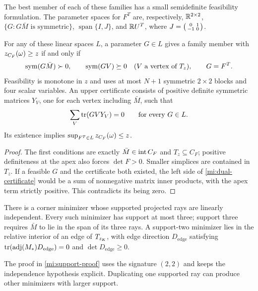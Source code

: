The best member of each of these families has a small semidefinite
feasibility formulation. The parameter spaces for $F^T$ are, respectively,
$\mathbb R^{2\times2}$, $\{G:G\bar M\text{ is symmetric}\}$,
$\operatorname{span}\{I,J\}$, and $\mathbb R U^T$, where
$J=\begin{psmallmatrix}0&1\\-1&0\end{psmallmatrix}$.

\begin{proposition}\label{mi:certificates}
For any of these linear spaces $L$, a parameter $G\in L$ gives a family
member with $z_{C_F}(\omega)\ge z$ if and only if
\[
 \operatorname{sym}(G\bar M)\succ0,\qquad \operatorname{sym}(GV)\succeq0\quad(V\text{ a vertex of }T_z),
 \qquad G=F^T.
\]
Feasibility is monotone in $z$ and uses at most $N+1$ symmetric
$2\times2$ blocks and four scalar variables.
An upper certificate consists of positive definite symmetric matrices
$Y_V$, one for each vertex including $\bar M$, such that
\begin{equation}\label{mi:dual-certificate}
 \sum_V\operatorname{tr}(GVY_V)=0\qquad\text{for every }G\in L.
\end{equation}
Its existence implies $\sup_{F^T\in L}z_{C_F}(\omega)\le z$.
\end{proposition}
\begin{proof}
The first conditions are exactly $\bar M\in\operatorname{int} C_F$ and $T_z\subseteq C_F$;
positive definiteness at the apex also forces $\det F>0$.
Smaller simplices are contained in $T_z$. If a feasible $G$ and the
certificate both existed, the left side of \cref{mi:dual-certificate}
would be a sum of nonnegative matrix inner products, with the apex term
strictly positive. This contradicts its being zero.
\end{proof}

\begin{proposition}\label{mi:support}
There is a corner minimizer whose supported projected rays are linearly
independent. Every such minimizer has support at most three; support three
requires $\bar M$ to lie in the span of its three rays.
A support-two minimizer lies in the relative interior of an edge of
$T_{z_K}$, with edge direction $D_{\mathrm{edge}}$ satisfying
$\operatorname{tr}(\operatorname{adj}(M_*)D_{\mathrm{edge}})=0$ and $\det D_{\mathrm{edge}}\ge0$.
\end{proposition}
\noindent
The proof in \cref{mi:support-proof} uses the signature $(2,2)$ and keeps
the independence hypothesis explicit. Duplicating one supported ray can
produce other minimizers with larger support.

